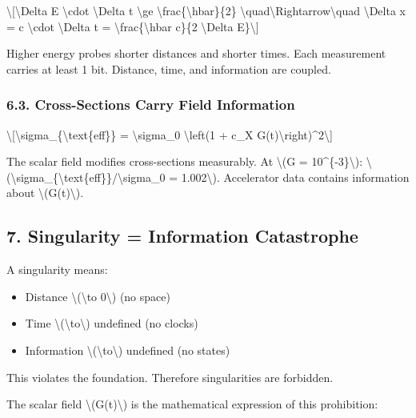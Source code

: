 \documentclass[
  10pt,
]{article}
\providecommand{\tightlist}{%
  \setlength{\itemsep}{0pt}\setlength{\parskip}{0pt}}
\begin{document}
\textbackslash{[}\textbackslash Delta E \textbackslash cdot
\textbackslash Delta t \textbackslash ge
\textbackslash frac\{\textbackslash hbar\}\{2\}
\textbackslash quad\textbackslash Rightarrow\textbackslash quad
\textbackslash Delta x = c \textbackslash cdot \textbackslash Delta t =
\textbackslash frac\{\textbackslash hbar c\}\{2 \textbackslash Delta
E\}\textbackslash{]}

Higher energy probes shorter distances and shorter times. Each
measurement carries at least 1 bit. Distance, time, and information are
coupled.

\hypertarget{cross-sections-carry-field-information}{%
\subsubsection{6.3. Cross-Sections Carry Field
Information}\label{cross-sections-carry-field-information}}

\textbackslash{[}\textbackslash sigma\_\{\textbackslash text\{eff\}\} =
\textbackslash sigma\_0 \textbackslash left(1 + c\_X
G(t)\textbackslash right)\^{}2\textbackslash{]}

The scalar field modifies cross-sections measurably. At \textbackslash(G
= 10\^{}\{-3\}\textbackslash):
\textbackslash(\textbackslash sigma\_\{\textbackslash text\{eff\}\}/\textbackslash sigma\_0
= 1.002\textbackslash). Accelerator data contains information about
\textbackslash(G(t)\textbackslash).

\hypertarget{singularity-information-catastrophe}{%
\subsection{7. Singularity = Information
Catastrophe}\label{singularity-information-catastrophe}}

A singularity means:

\begin{itemize}
\tightlist
\item
  Distance \textbackslash(\textbackslash to 0\textbackslash) (no space)
\item
  Time \textbackslash(\textbackslash to\textbackslash) undefined (no
  clocks)
\item
  Information \textbackslash(\textbackslash to\textbackslash) undefined
  (no states)
\end{itemize}

This violates the foundation. Therefore singularities are forbidden.

The scalar field \textbackslash(G(t)\textbackslash) is the mathematical
expression of this prohibition:
\end{document}

